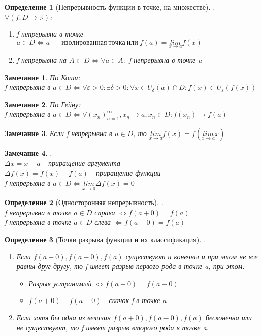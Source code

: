\documentclass[12pt, a4]{article}
\newtheorem*{definition}{Определение}
\newtheorem*{remark}{Замечание}
\renewcommand{\lim}[2]{\underset{#1 \rightarrow #2}{lim}}
\renewcommand{\iff}{\Leftrightarrow}
\renewcommand{\epsilon}{\varepsilon}
\newcommand{\R}{\mathbb{R}}
\begin{document}
\begin{definition}[Непрерывность функции в точке, на множестве].\\
$\forall (f: D \to \R)$:
\begin{enumerate}
    \item f непрерывна в точке $a \in D \iff a\ -\ изолированная\ точка\ или\ f(a) = \lim{x}{a}f(x)$
    \item f непрерывна на $A \subset D \iff \forall a\in A:$ f непрерывна в точке a
\end{enumerate}
\end{definition}

\begin{remark}По Коши:\\
f непрерывна в $a \in D \iff \forall \epsilon > 0: \exists \delta > 0: \forall x \in U_\delta(a) \cap D: f(x) \in U_\epsilon(f(x))$
\end{remark}

\begin{remark}По Гейну:\\
f непрерывна в $a \in D \iff \forall (x_n)_{n=1}^\infty, x_n \to a, x_n \in D: f(x_n) \to f(a)$
\end{remark}

\begin{remark}
Если f непрерывна в $a \in D$, то $\lim{x}{a}f(x) = f(\lim{x}{a}x)$
\end{remark}

\begin{remark}.\\
$\Delta x = x - a$ - приращение аргумента\\
$\Delta f(x) = f(x) - f(a)$ - приращение функции\\
f непрерывна в $a \in D \iff \lim{x}{0}\Delta f(x) = 0$
\end{remark}

\begin{definition}[Односторонняя непрерывность].\\
f непрерывна в точке $a \in D$ справа $\iff f(a+0) = f(a)$\\
f непрерывна в точке $a \in D$ слева $\iff f(a-0) = f(a)$\\
\end{definition}

\begin{definition}[Точки разрыва функции и их классификация].\\
\begin{enumerate}
    \item Если $f(a+0), f(a-0), f(a)$ существуют и конечны и при этом не все равны друг другу, то f имеет разрыв первого рода в точке a, при этом:
\begin{itemize}
    \item Разрыв устранимый $\iff f(a+0) = f(a-0)$
    \item $f(a+0) - f(a-0)$ - скачок f в точке a
\end{itemize}
\item Если хотя бы одна из величин $f(a+0), f(a-0), f(a)$ бесконечна или не существуют, то f имеет разрыв второго рода в точке a.
\end{enumerate}
\end{definition}
\end{document}
